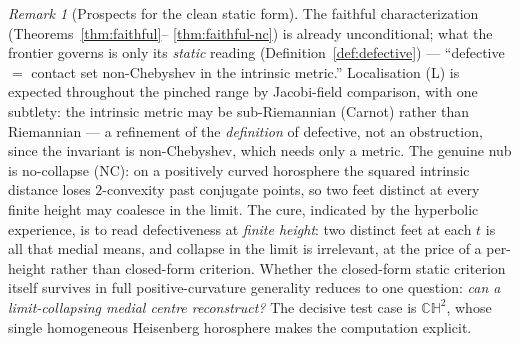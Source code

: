 \documentclass[11pt]{article}
\theoremstyle{remark}
\newtheorem{remark}[theorem]{Remark}
\begin{document}
\begin{remark}[Prospects for the clean static form]\label{rem:prospects}
The faithful characterization (Theorems~\ref{thm:faithful}--%
\ref{thm:faithful-nc}) is already unconditional; what the frontier
governs is only its \emph{static} reading
(Definition~\ref{def:defective}) --- ``defective $=$ contact set
non-Chebyshev in the intrinsic metric.'' Localisation (L) is expected
throughout the pinched range by Jacobi-field comparison, with one
subtlety: the intrinsic metric may be sub-Riemannian (Carnot) rather
than Riemannian --- a refinement of the \emph{definition} of defective,
not an obstruction, since the invariant is non-Chebyshev, which needs
only a metric. The genuine nub is no-collapse (NC): on a positively
curved horosphere the squared intrinsic distance loses $2$-convexity
past conjugate points, so two feet distinct at every finite height may
coalesce in the limit. The cure, indicated by the hyperbolic
experience, is to read defectiveness at \emph{finite height}: two
distinct feet at each $t$ is all that medial means, and collapse in the
limit is irrelevant, at the price of a per-height rather than
closed-form criterion. Whether the closed-form static criterion itself
survives in full positive-curvature generality reduces to one question:
\emph{can a limit-collapsing medial centre reconstruct?} The decisive
test case is $\mathbb{CH}^{2}$, whose single homogeneous Heisenberg
horosphere makes the computation explicit.
\end{remark}
\end{document}
